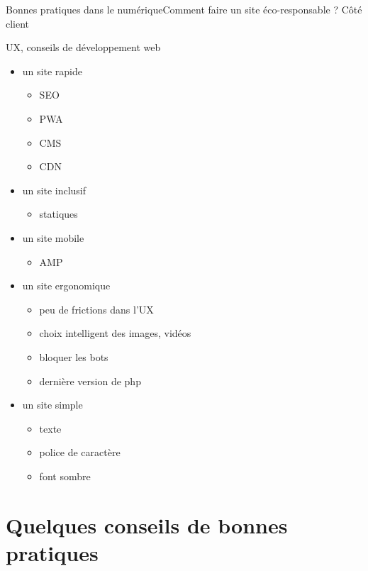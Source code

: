 
\begin{frame}{Bonnes pratiques dans le numérique}{Comment faire un site éco-responsable ? Côté client}
\begin{block}{UX, conseils de développement web}

\begin{minipage}[b]{0.45\linewidth}

\begin{itemize}
\item un site rapide 
\begin{itemize}
    \item SEO 
    \item PWA
    \item CMS
    \item CDN
\end{itemize}
\item un site inclusif
\begin{itemize}
    \item statiques
\end{itemize}
\item un site mobile 
\begin{itemize}
    \item AMP
\end{itemize}
\end{itemize}
\end{minipage}\hfill
\begin{minipage}[b]{0.55\linewidth}  
\begin{itemize}
\item un site ergonomique 
\begin{itemize}
    \item peu de frictions dans l'UX
    \item choix intelligent des images, vidéos
    \item bloquer les bots
    \item dernière version de php
\end{itemize}
\item un site simple 
\begin{itemize}
    \item texte
    \item police de caractère
    \item font sombre
\end{itemize}
\end{itemize}

\end{minipage}\hfill
\end{block}
    
\end{frame}

\section{Quelques conseils de bonnes pratiques}